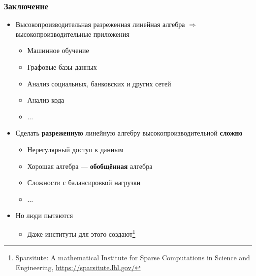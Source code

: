 \documentclass[xcolor=table,aspectratio=169]{beamer}
\begin{document}
\begin{frame}[fragile]
  \frametitle{Заключение}  
  \begin{itemize}
    \item Высокопроизводительная разреженная линейная алгебра $\Rightarrow$ высокопроизводительные приложения
    \begin{itemize}
      \item Машинное обучение
      \item Графовые базы данных
      \item Анализ социальных, банковских и других сетей
      \item Анализ кода
      \item $\ldots$
    \end{itemize}
    \item Сделать \textbf{разреженную} линейную алгебру высокопроизводительной \textbf{сложно}
    \begin{itemize}
      \item Нерегулярный доступ к данным
      \item Хорошая алгебра --- \textbf{обобщённая} алгебра
      \item Сложности с балансировкой нагрузки
      \item $\ldots$
    \end{itemize}
    \item Но люди пытаются
    \begin{itemize}
      \item Даже институты для этого создают\footnote{Sparsitute: A mathematical Institute for Sparse Computations in Science and Engineering, \href{https://sparsitute.lbl.gov/}{https://sparsitute.lbl.gov/}}
    \end{itemize}
  \end{itemize}
\end{frame}
\end{document}

